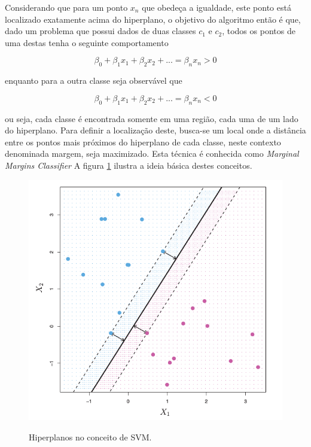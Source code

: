 Considerando que para um ponto $x_{n}$ que obedeça a igualdade, este ponto está localizado exatamente acima do hiperplano, o objetivo do algoritmo então é que, dado um problema que possui dados de duas classes $c_{1}$ e $c_{2}$, todos os pontos de uma destas tenha o seguinte comportamento  

\begin{equation}
\label{e.hyperplane-div1}
\beta_{0} + \beta_{1}x_{1} + \beta_{2}x_{2} + ... = \beta_{n}x_{n} > 0
\end{equation}

enquanto para a outra classe seja observável que

\begin{equation}
\label{e.hyperplane-div2}
\beta_{0} + \beta_{1}x_{1} + \beta_{2}x_{2} + ... = \beta_{n}x_{n} < 0
\end{equation}

ou seja, cada classe é encontrada somente em uma região, cada uma de um lado do hiperplano. Para definir a localização deste, busca-se um local onde a distância entre os pontos mais próximos do hiperplano de cada classe, neste contexto denominada margem, seja maximizado. Esta técnica é conhecida como \textit{Marginal Margins Classifier}
\cite{James:2014:ISL:2517747} A figura \ref{f.hiperplano-svm} ilustra a ideia básica destes conceitos.

\begin{figure}[ht]
\caption{\small Hiperplanos no conceito de SVM.}
\centering
\includegraphics[scale=0.40]{figs/svm-plano.png}
\label{f.hiperplano-svm}
\end{figure}

